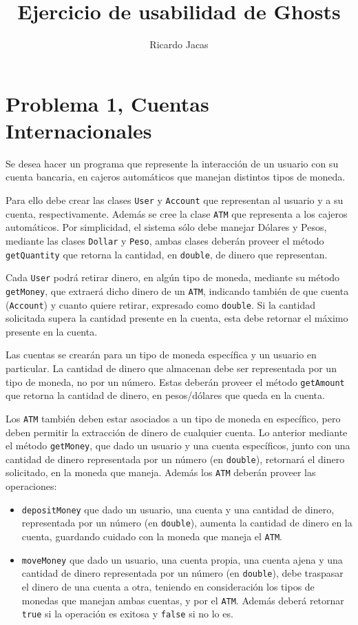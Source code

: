 \documentclass[11pt,spanish,letterpaper]{report}
\title{Ejercicio de usabilidad de Ghosts}
\author{Ricardo Jacas}
\begin{document}
\maketitle

\section*{Problema 1, Cuentas Internacionales}

Se desea hacer un programa que represente la interacción de un usuario con su cuenta bancaria, en cajeros automáticos que manejan distintos tipos de moneda.

Para ello debe crear las clases {\tt User} y {\tt Account} que representan al usuario y a su cuenta, respectivamente. Además se cree la clase {\tt ATM} que representa a los cajeros automáticos. Por simplicidad, el sistema sólo debe manejar Dólares y Pesos, mediante las clases {\tt Dollar} y {\tt Peso}, ambas clases deberán proveer  el método {\tt getQuantity} que retorna la cantidad, en {\tt double}, de dinero que representan.

Cada {\tt User} podrá retirar dinero, en algún tipo de moneda, mediante su método {\tt getMoney}, que extraerá dicho dinero de un {\tt ATM}, indicando también de que cuenta ({\tt Account}) y cuanto quiere retirar, expresado como {\tt double}. Si la cantidad solicitada supera la cantidad presente en la cuenta, esta debe retornar el máximo presente en la cuenta.

Las cuentas se crearán para un tipo de moneda específica y un usuario en particular. La cantidad de dinero que almacenan debe ser representada por un tipo de moneda, no por un número. Estas deberán proveer el método {\tt getAmount} que retorna la cantidad de dinero, en pesos/dólares que queda en la cuenta. 

Los {\tt ATM} también deben estar asociados a un tipo de moneda en específico, pero deben permitir la extracción de dinero de cualquier cuenta. Lo anterior mediante el método {\tt getMoney}, que dado un usuario y una cuenta específicos, junto con una cantidad de dinero representada por un número (en  {\tt double}), retornará el dinero solicitado, en la moneda que maneja. Además los {\tt ATM} deberán proveer las operaciones:
\begin{itemize}
	\item {\tt depositMoney} que dado un usuario, una cuenta y una cantidad de dinero, representada por un número (en  {\tt double}), aumenta la cantidad de dinero en la cuenta, guardando cuidado con la moneda que maneja el {\tt ATM}.
	\item {\tt moveMoney} que dado un usuario, una cuenta propia, una cuenta ajena y una cantidad de dinero representada por un número (en  {\tt double}), debe traspasar el dinero de una cuenta a otra, teniendo en consideración los tipos de monedas que manejan ambas cuentas, y por el {\tt ATM}. Además deberá retornar {\tt true} si la operación es exitosa y {\tt false} si no lo es.
\end{itemize}
	
\end{document}
